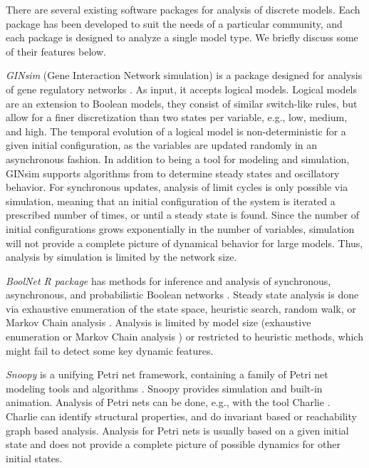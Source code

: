 \documentclass[11pt]{amsart}
\begin{document}
 
 

 
There are several existing software packages for analysis of discrete models. Each package has been developed to suit the needs of a particular community, and each package is designed to analyze a single model type. We briefly discuss some of their features below.


{\it GINsim} (Gene Interaction Network simulation) is a package designed for analysis of gene regulatory networks \cite{GINsim}. As input, it accepts logical models. Logical models are an extension to Boolean models, they consist of similar switch-like rules, but allow for a finer discretization than two states per variable, e.g., low, medium, and high. The temporal evolution of a logical model is non-deterministic for a given initial configuration, as the variables are updated randomly in an asynchronous fashion. In addition to being a tool for modeling and simulation, GINsim supports algorithms from \cite{Chaouiya} to determine steady states and oscillatory behavior. For synchronous updates, analysis of limit cycles is only possible via simulation, meaning that an
initial configuration of the system is iterated a prescribed number of times, or until a
steady state is found. Since the number of initial configurations grows exponentially in the number of variables, simulation
will not provide a complete picture of dynamical behavior for large models. Thus, analysis by simulation is limited by the network size.   



{\it BoolNet R package} has methods for inference and analysis of synchronous, asynchronous, and probabilistic Boolean networks \cite{boolnet}. Steady state analysis is done via exhaustive enumeration of the state space, heuristic search, random walk, or Markov Chain analysis \cite{shmulevich}. Analysis is limited by model size (exhaustive enumeration or Markov Chain analysis ) or restricted to heuristic methods, which might fail to detect some key dynamic features. 


{\it Snoopy} is a unifying Petri net framework, containing a family of Petri net modeling tools and algorithms \cite{Snoopy}. Snoopy provides simulation and built-in animation. Analysis of Petri nets can be done, e.g., with the tool Charlie \cite{Charlie}. Charlie can identify structural properties, and do invariant based or reachability graph based analysis. Analysis for Petri nets is usually based on a given initial state and does not provide a complete picture of possible dynamics for other initial states. 
\end{document}
